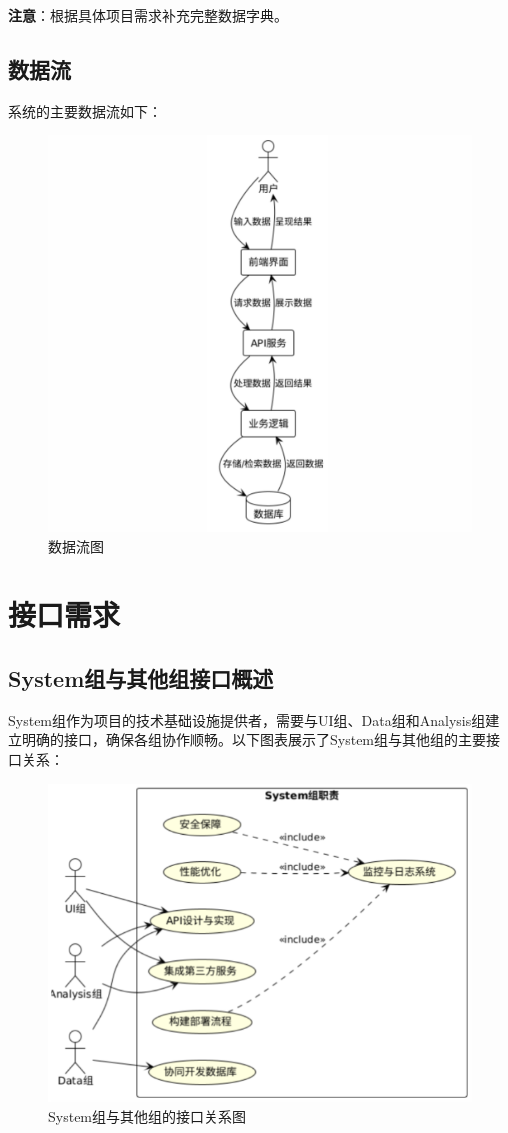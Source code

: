 \documentclass[a4paper,12pt]{article}
\begin{document}
\textbf{注意}：根据具体项目需求补充完整数据字典。

\subsection{数据流}

系统的主要数据流如下：

\begin{figure}[H]
    \centering
    \includegraphics[width=0.75\linewidth]{assets/6.png}
    \caption{数据流图}
    \label{fig:data-flow}
\end{figure}
\section{接口需求}

\subsection{System组与其他组接口概述}

System组作为项目的技术基础设施提供者，需要与UI组、Data组和Analysis组建立明确的接口，确保各组协作顺畅。以下图表展示了System组与其他组的主要接口关系：

\begin{figure}[H]
    \centering
    \includegraphics[width=0.8\linewidth]{assets/image2.png}
    \caption{System组与其他组的接口关系图}
    \label{fig:interface-relations}
\end{figure}
\end{document}
